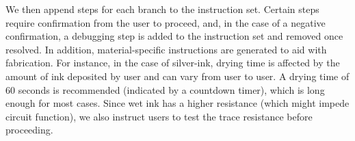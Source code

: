\documentclass{sigchi}
\begin{document}
        We then append steps for each branch to the instruction set. Certain steps require confirmation from the user to proceed, and, in the case of a negative confirmation, a debugging step is added to the instruction set and removed once resolved. In addition, material-specific instructions are generated to aid with fabrication. For instance, in the case of silver-ink, drying time is affected by the amount of ink deposited by user and can vary from user to user. A drying time of 60 seconds is recommended (indicated by a countdown timer), which is long enough for most cases. Since wet ink has a higher resistance (which might impede circuit function), we also instruct users to test the trace resistance before proceeding. 
        
        
\end{document}
